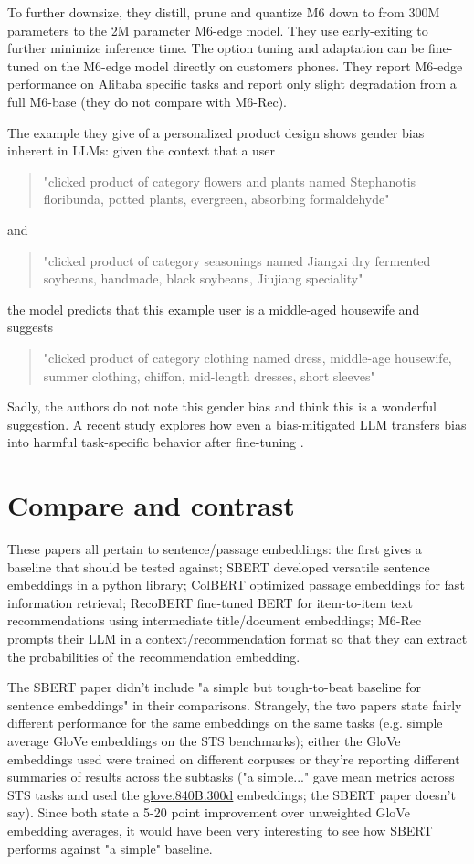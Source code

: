 \documentclass[11pt]{article}
\begin{document}
To further downsize, they distill, prune and quantize M6 down to from 300M parameters to the 2M parameter M6-edge model. They use early-exiting to further minimize inference time. The option tuning and adaptation can be fine-tuned on the M6-edge model directly on customers phones. They report M6-edge performance on Alibaba specific tasks and report only slight degradation from a full M6-base (they do not compare with M6-Rec).

The example they give of a personalized product design shows gender bias inherent in LLMs: given the context that a user
\begin{quote}
  "clicked product of category flowers and plants named Stephanotis floribunda, potted plants, evergreen, absorbing formaldehyde"
\end{quote}
and 
\begin{quote}
  "clicked product of category seasonings named Jiangxi dry fermented soybeans, handmade, black soybeans, Jiujiang speciality"
\end{quote}
the model predicts that this example user is a middle-aged housewife and suggests 
\begin{quote}
  "clicked product of category clothing named dress, middle-age housewife, summer clothing, chiffon, mid-length dresses, short sleeves"
\end{quote}
Sadly, the authors do not note this gender bias and think this is a wonderful suggestion. A recent study explores how even a bias-mitigated LLM transfers bias into harmful task-specific behavior after fine-tuning \cite{Steed2022-upstream}.

\section{Compare and contrast} 

These papers all pertain to sentence/passage embeddings: the first gives a baseline that should be tested against; SBERT developed versatile sentence embeddings in a python library; ColBERT optimized passage embeddings for fast information retrieval; RecoBERT fine-tuned BERT for item-to-item text recommendations using intermediate title/document embeddings; M6-Rec prompts their LLM in a context/recommendation format so that they can extract the probabilities of the recommendation embedding. 

The SBERT paper didn't include "a simple but tough-to-beat baseline for sentence embeddings" \cite{Arora2017} in their comparisons. Strangely, the two papers state fairly different performance for the same embeddings on the same tasks (e.g. simple average GloVe embeddings \cite{GloVe} on the STS benchmarks); either the GloVe embeddings used were trained on different corpuses or they're reporting different summaries of results across the subtasks ("a simple..." gave mean metrics across STS tasks and used the \href{https://nlp.stanford.edu/projects/glove/}{glove.840B.300d} embeddings; the SBERT paper doesn't say). Since both state a 5-20 point improvement over unweighted GloVe embedding averages, it would have been very interesting to see how SBERT performs against "a simple" baseline.
\end{document}
